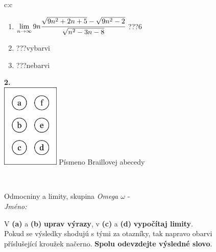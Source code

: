 \documentclass[10pt]{report}
\begin{document}
\begin{tabular}{c:c}
\begin{minipage}[c][104.5mm][t]{0.5\linewidth}
\begin{center}
\begin{minipage}{0.79\linewidth}
\begin{center}
\begin{varwidth}{\linewidth}
\begin{enumerate}
\item $\lim\limits_{n\to\infty}9n\cfrac{\sqrt{9n^2+2n+5}-\sqrt{9n^2-2}}{\sqrt{n^2-3n-8}}$\quad \dotfill\; ???\;\dotfill \quad $6$
\item \quad \dotfill\; ???\;\dotfill \quad vybarvi
\item \quad \dotfill\; ???\;\dotfill \quad nebarvi
\end{enumerate}
\end{varwidth}
\end{center}
\end{minipage}
\begin{minipage}{0.20\linewidth}
\begin{center}
{\Huge\bfseries 2.} \\[2mm]
\includegraphics[height=40mm]{../images/braille.png}
{\small Písmeno Braillovej abecedy}
\end{center}
\end{minipage}
\end{center}
\end{minipage}
\\ \hdashline
\begin{minipage}[c][104.5mm][t]{0.5\linewidth}
\begin{center}
\vspace{7mm}
{\huge Odmocniny a limity, skupina \textit{Omega $\omega$} -}\\[5mm]
\textit{Jméno:}\phantom{xxxxxxxxxxxxxxxxxxxxxxxxxxxxxxxxxxxxxxxxxxxxxxxxxxxxxxxxxxxxxxxxx}\\[5mm]
\begin{minipage}{0.95\linewidth}
\begin{center}
V \textbf{(a)} a \textbf{(b)} \textbf{uprav výrazy}, v \textbf{(c)} a \textbf{(d)} \textbf{vypočítaj limity}.\\Pokud se výsledky shodujú s tými za otazníky, tak napravo obarvi\\příslušející kroužek načerno. \textbf{Spolu odevzdejte výsledné slovo}.
\end{center}
\end{minipage}
\\[1mm]

\end{center}
\end{minipage}
\end{tabular}
\end{document}
